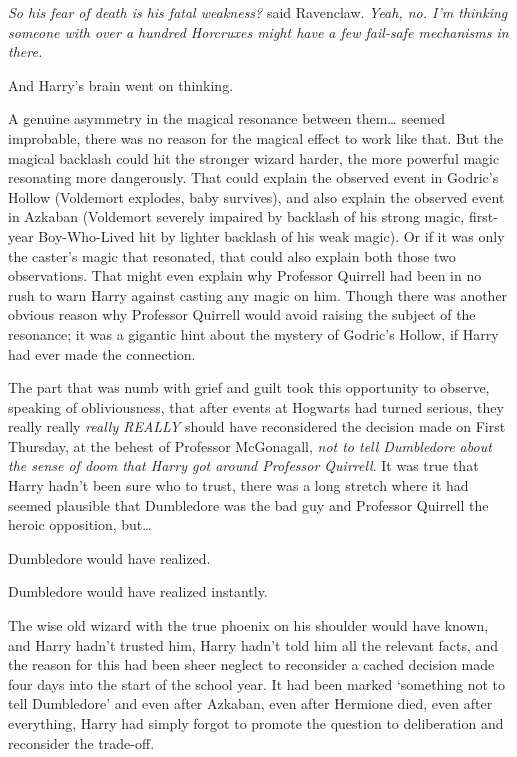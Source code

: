 \emph{So his fear of death is his fatal weakness?} said Ravenclaw. \emph{Yeah, no. I'm thinking someone with over a hundred Horcruxes might have a few fail-safe mechanisms in there.}

And Harry's brain went on thinking.

A genuine asymmetry in the magical resonance between them{\ldots} seemed improbable, there was no reason for the magical effect to work like that. But the magical backlash could hit the stronger wizard harder, the more powerful magic resonating more dangerously. That could explain the observed event in Godric's Hollow (Voldemort explodes, baby survives), and also explain the observed event in Azkaban (Voldemort severely impaired by backlash of his strong magic, first-year Boy-Who-Lived hit by lighter backlash of his weak magic). Or if it was only the caster's magic that resonated, that could also explain both those two observations. That might even explain why Professor Quirrell had been in no rush to warn Harry against casting any magic on him. Though there was another obvious reason why Professor Quirrell would avoid raising the subject of the resonance; it was a gigantic hint about the mystery of Godric's Hollow, if Harry had ever made the connection.

The part that was numb with grief and guilt took this opportunity to observe, speaking of obliviousness, that after events at Hogwarts had turned serious, they really really \emph{really REALLY} should have reconsidered the decision made on First Thursday, at the behest of Professor McGonagall, \emph{not to tell Dumbledore about the sense of doom that Harry got around Professor Quirrell}. It was true that Harry hadn't been sure who to trust, there was a long stretch where it had seemed plausible that Dumbledore was the bad guy and Professor Quirrell the heroic opposition, but{\ldots}

Dumbledore would have realized.

Dumbledore would have realized instantly.

The wise old wizard with the true phoenix on his shoulder would have known, and Harry hadn't trusted him, Harry hadn't told him all the relevant facts, and the reason for this had been sheer neglect to reconsider a cached decision made four days into the start of the school year. It had been marked `something not to tell Dumbledore' and even after Azkaban, even after Hermione died, even after everything, Harry had simply forgot to promote the question to deliberation and reconsider the trade-off.

